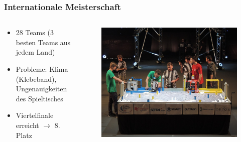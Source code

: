 \begin{frame}
	\frametitle{Internationale Meisterschaft}
	
	\vspace{-3em}
	
	\begin{columns}[t]
		\begin{column}{0.45\textwidth}
			\begin{center}
				\begin{itemize}
					\item 28 Teams (3 besten Teams aus jedem Land)
					\item Probleme: Klima (Klebeband), Ungenauigkeiten des Spieltisches
					\item Viertelfinale erreicht $\rightarrow$ 8. Platz
				\end{itemize}
			\end{center}
		\end{column}
		\begin{column}{0.55\textwidth}
			\begin{figure}
				\includegraphics[width=0.9\columnwidth]{../images/presentation/international.jpg}
			\end{figure}
		\end{column}
	\end{columns}
	
\end{frame}